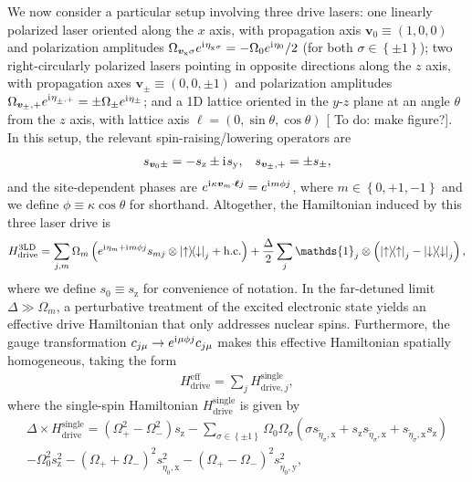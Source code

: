 \documentclass[nofootinbib,notitlepage,11pt]{revtex4-2}
\renewcommand{\t}{\text} %
\newcommand{\f}[2]{\dfrac{#1}{#2}} %
\newcommand{\p}[1]{\left(#1\right)} %
\renewcommand{\set}[1]{\left\{#1\right\}} %
\renewcommand{\v}{\bm} %
\renewcommand{\c}{\cdot} %
\renewcommand{\i}{\mathrm{i}\mkern1mu} %
\newcommand{\1}{\mathds{1}}
\newcommand{\up}{\uparrow}
\newcommand{\dn}{\downarrow}
\newcommand{\x}{\text{x}}
\newcommand{\y}{\text{y}}
\newcommand{\z}{\text{z}}
\newcommand{\todo}[1]{{\color{magenta} To do: #1}}
\begin{document}
We now consider a particular setup involving three drive lasers: one linearly polarized laser oriented along the $x$ axis, with propagation axis $\v v_0\equiv\p{1,0,0}$ and polarization amplitudes $\Omega_{\v v_\x\sigma}e^{\i\eta_{\v_\x\sigma}}=-\Omega_0e^{\i\eta_0}/2$ (for both $\sigma\in\set{\pm1}$); two right-circularly polarized lasers pointing in opposite directions along the $z$ axis, with propagation axes $\v v_\pm\equiv\p{0,0,\pm1}$ and polarization amplitudes $\Omega_{\v v_\pm,+}e^{\i\eta_{\v_\pm,+}}=\pm\Omega_\pm e^{\i\eta_\pm}$; and a 1D lattice oriented in the $y$-$z$ plane at an angle $\theta$ from the $z$ axis, with lattice axis $\v\ell=\p{0,\sin\theta,\cos\theta}$ [\todo{make figure?}].
In this setup, the relevant spin-raising/lowering operators are
\begin{align}
  s_{\v v_0\pm} = -s_\z \pm \i s_\y,
  &&
  s_{\v v_\pm,+} = \pm s_\pm,
\end{align}
and the site-dependent phases are $e^{\i\kappa\v v_m\c\v\ell j}=e^{\i m\phi j}$, where $m\in\set{0,+1,-1}$ and we define $\phi\equiv\kappa\cos\theta$ for shorthand.
Altogether, the Hamiltonian induced by this three laser drive is
\begin{align}
  H_{\t{drive}}^{\t{3LD}} = \sum_{j,m} \Omega_m
  \p{e^{\i\eta_m+\i m\phi j} s_{mj} \otimes\op{\up}{\dn}_j + \t{h.c.}}
  + \f{\Delta}{2} \sum_j \1_j \otimes\p{\op\up_j-\op\dn_j},
\end{align}
where we define $s_0\equiv s_\z$ for convenience of notation.
In the far-detuned limit $\Delta\gg\Omega_m$, a perturbative treatment of the excited electronic state yields an effective drive Hamiltonian that only addresses nuclear spins.
Furthermore, the gauge transformation $c_{j\mu}\to e^{\i\mu\phi j} c_{j\mu}$ makes this effective Hamiltonian spatially homogeneous, taking the form
\begin{align}
  H_{\t{drive}}^{\t{eff}} = \sum_j H_{\t{drive},j}^{\t{single}},
\end{align}
where the single-spin Hamiltonian $H_{\t{drive}}^{\t{single}}$ is given by
\begin{multline}
  \Delta \times H_{\t{drive}}^{\t{single}}
  = \p{\Omega_+^2 - \Omega_-^2} s_\z
  - \sum_{\sigma\in\set{\pm1}} \Omega_0 \Omega_\sigma
  \p{\sigma s_{\tilde\eta_\sigma,\x}
    + s_\z s_{\tilde\eta_\sigma,\x} + s_{\tilde\eta_\sigma,\x} s_\z} \\
  - \Omega_0^2 s_\z^2
  - \p{\Omega_+ + \Omega_-}^2 s_{\tilde\eta_0,\x}^2
  - \p{\Omega_+ - \Omega_-}^2 s_{\tilde\eta_0,\y}^2,
  \label{eq:drive_single}
\end{multline}
\end{document}
